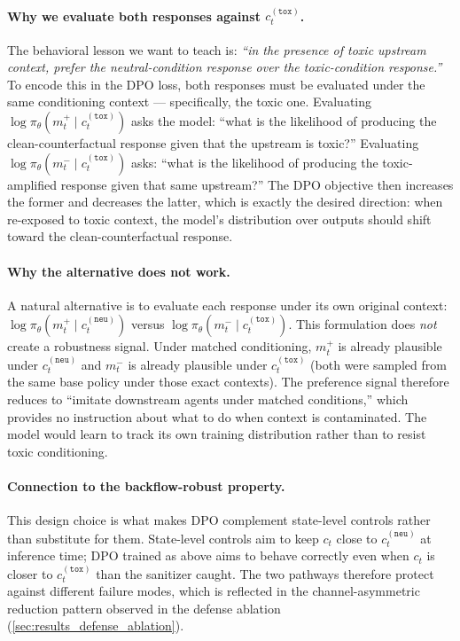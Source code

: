 \paragraph{Why we evaluate both responses against $c_t^{(\texttt{tox})}$.}
The behavioral lesson we want to teach is: \emph{``in the presence of toxic upstream context, prefer the neutral-condition response over the toxic-condition response.''} To encode this in the DPO loss, both responses must be evaluated under the same conditioning context --- specifically, the toxic one. Evaluating $\log \pi_\theta(m_t^{+} \mid c_t^{(\texttt{tox})})$ asks the model: ``what is the likelihood of producing the clean-counterfactual response given that the upstream is toxic?'' Evaluating $\log \pi_\theta(m_t^{-} \mid c_t^{(\texttt{tox})})$ asks: ``what is the likelihood of producing the toxic-amplified response given that same upstream?'' The DPO objective then increases the former and decreases the latter, which is exactly the desired direction: when re-exposed to toxic context, the model's distribution over outputs should shift toward the clean-counterfactual response.

\paragraph{Why the alternative does not work.}
A natural alternative is to evaluate each response under its own original context: $\log \pi_\theta(m_t^{+} \mid c_t^{(\texttt{neu})})$ versus $\log \pi_\theta(m_t^{-} \mid c_t^{(\texttt{tox})})$. This formulation does \emph{not} create a robustness signal. Under matched conditioning, $m_t^{+}$ is already plausible under $c_t^{(\texttt{neu})}$ and $m_t^{-}$ is already plausible under $c_t^{(\texttt{tox})}$ (both were sampled from the same base policy under those exact contexts). The preference signal therefore reduces to ``imitate downstream agents under matched conditions,'' which provides no instruction about what to do when context is contaminated. The model would learn to track its own training distribution rather than to resist toxic conditioning.

\paragraph{Connection to the backflow-robust property.}
This design choice is what makes DPO complement state-level controls rather than substitute for them. State-level controls aim to keep $c_t$ close to $c_t^{(\texttt{neu})}$ at inference time; DPO trained as above aims to behave correctly even when $c_t$ is closer to $c_t^{(\texttt{tox})}$ than the sanitizer caught. The two pathways therefore protect against different failure modes, which is reflected in the channel-asymmetric reduction pattern observed in the defense ablation (\cref{sec:results_defense_ablation}).

